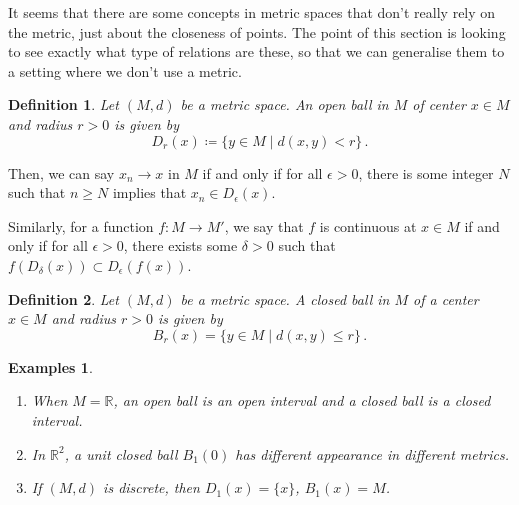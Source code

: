\documentclass{article}
\theoremstyle{plain}\theoremheaderfont{\normalfont\itshape}\theorembodyfont{\rmfamily}\theoremseparator{.}\newtheorem*{rem}{Remark}\newtheorem*{ex}{Example}\newtheorem*{proof}{Proof}\newtheorem*{altp}{Alternative proof}
\theoremstyle{plain}\theoremheaderfont{\normalfont\bfseries}\theorembodyfont{\rmfamily}\theoremseparator{.}\newtheorem{thm}{Theorem}[section]\newtheorem{lem}[thm]{Lemma}\newtheorem{prop}[thm]{Proposition}\newtheorem*{cor}{Corollary}\newtheorem{defn}[thm]{Definition}\newtheorem{clm}[thm]{Claim}\newtheorem{clminproof}{Claim}
\theoremstyle{break}\theoremheaderfont{\normalfont\itshape}\theorembodyfont{\rmfamily}\theoremseparator{.\medskip}\newtheorem*{proofskip}{Proof}\newtheorem*{exs}{Examples}\newtheorem*{rems}{Remarks}
\theoremstyle{break}\theoremheaderfont{\normalfont\bfseries}\theorembodyfont{\rmfamily}\theoremseparator{.\medskip}\newtheorem{lemskip}[thm]{Lemma}\newtheorem{defnskip}[thm]{Definition}\newtheorem{propskip}[thm]{Proposition}\newtheorem{thmskip}[thm]{Theorem}
\begin{document}
    It seems that there are some concepts in metric spaces that don't really rely on the metric, just about the closeness of points. The point of this section is looking to see exactly what type of relations are these, so that we can generalise them to a setting where we don't use a metric.

    \begin{defn}
        Let \((M,d)\) be a metric space. An \textit{open ball} in \(M\) of center \(x\in M\) and radius \(r>0\) is given by
        \[D_r(x)\coloneqq\{y\in M\mid d(x,y)<r\}\,.\]
    \end{defn}

    Then, we can say \(x_n\to x\) in \(M\) if and only if for all \(\epsilon>0\), there is some integer \(N\) such that \(n\ge N\) implies that \(x_n\in D_\epsilon(x)\).

    Similarly, for a function \(f:M\to M'\), we say that \(f\) is continuous at \(x\in M\) if and only if for all \(\epsilon>0\), there exists some \(\delta>0\) such that \(f(D_\delta(x))\subset D_\epsilon(f(x))\).

    \begin{defn}
        Let \((M,d)\) be a metric space. A \textit{closed ball} in \(M\) of a center \(x\in M\) and radius \(r>0\) is given by
        \[B_r(x)=\{y\in M\mid d(x,y)\le r\}\,.\]
    \end{defn}
    
    \begin{exs}
        \begin{enumerate}[topsep=0pt,label=(\roman*)]
            \item When \(M=\mathbb{R}\), an open ball is an open interval and a closed ball is a closed interval.
            \item In \(\mathbb{R}^2\), a unit closed ball \(B_1(0)\) has different appearance in different metrics.
            \begin{center}
                \hfill{}
                \hfill{}
            \end{center}
            \item If \((M,d)\) is discrete, then \(D_1(x)=\{x\}\), \(B_1(x)=M\).
        \end{enumerate}
    \end{exs}
\end{document}
